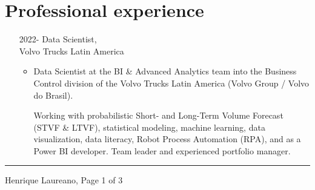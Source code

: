 \documentclass[12pt]{article}
\newcommand{\horrule}[1]{\noindent\rule{\linewidth}{#1}}
\begin{document}
\vspace{-0.5cm}
\section*{Professional experience}

\begin{itemize}
 \item[2022-] Data Scientist,\\
              Volvo Trucks Latin America
  \begin{itemize}
  \item Data Scientist at the BI \& Advanced Analytics team into the
        Business Control division of the Volvo Trucks Latin America (Volvo Group
        / Volvo do Brasil).

        Working with probabilistic Short- and Long-Term Volume Forecast 
        (STVF \& LTVF), statistical modeling, machine learning, data 
        visualization, data literacy, Robot Process Automation (RPA), and as a 
        Power BI developer. Team leader and experienced portfolio manager.
  \end{itemize}
\end{itemize}

\vspace{\fill}
\horrule{1pt}
\noindent Henrique Laureano, \hfill Page 1 of 3
\end{document}
